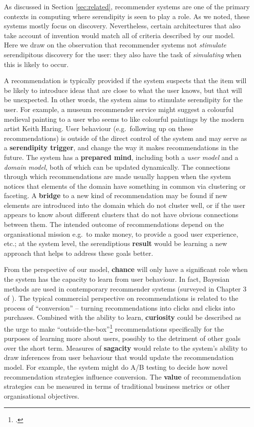 As discussed in Section \ref{sec:related}, recommender systems are one
of the primary contexts in computing where serendipity is seen to play
a role.  As we noted, these systems mostly focus on discovery.
Nevertheless, certain architectures that also take account of
invention would match all of criteria described by our model.  Here we
draw on the observation that recommender systems not \emph{stimulate}
serendipitous discovery for the user: they also have the task of
\emph{simulating} when this is likely to occur.

A recommendation is typically provided if the system suspects that the
item will be likely to introduce ideas that are close to what the user
knows, but that will be unexpected.  In other words, the system aims
to stimulate serendipity for the user. For example, a museum
recommender service might suggest a colourful medieval painting to a
user who seems to like colourful paintings by the modern artist Keith
Haring.  User behaviour (e.g.~following up on these recommendations)
is outside of the direct control of the system and may serve as a
\textbf{serendipity trigger}, and change the way it makes
recommendations in the future.  The system has a \textbf{prepared
  mind}, including both a \emph{user model} and a \emph{domain model},
both of which can be updated dynamically.  The connections through
which recommendations are made usually happen when the system notices
that elements of the domain have something in common via clustering or
faceting.  A \textbf{bridge} to a new kind of recommendation may be
found if new elements are introduced into the domain which do not
cluster well, or if the user appears to know about different clusters
that do not have obvious connections between them.  The intended
outcome of recommendations depend on the organisational mission
e.g.~to make money, to provide a good user experience, etc.; at the
system level, the serendiptious \textbf{result} would be learning a
new approach that helps to address these goals better.

From the perspective of our model, \textbf{chance} will only have a
significant role when the system has the capacity to learn from user
behaviour.  In fact, Bayesian methods are used in contemporary
recommender systems (surveyed in Chapter 3 of
).  The typical commercial perspective on
recommendations is related to the process of ``conversion'' -- turning
recommendations into clicks and clicks into purchases.  Combined with
the ability to learn, \textbf{curiosity} could be described as the
urge to make ``outside-the-box''\footnote{.}
recommendations specifically for the purposes of learning more about
users, possibly to the detriment of other goals over the short term.
Measures of \textbf{sagacity} would relate to the system's ability to
draw inferences from user behaviour that would update the
recommendation model.  For example, the system might do A/B testing to
decide how novel recommendation strategies influence conversion.  The
\textbf{value} of recommendation strategies can be measured in terms
of traditional business metrics or other organisational objectives.

